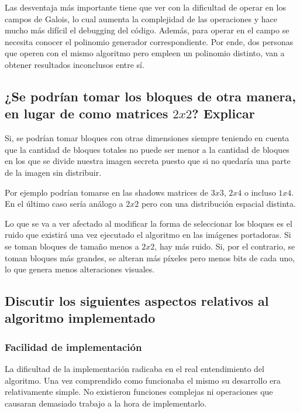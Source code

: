 \documentclass[11pt]{scrartcl} %
\begin{document}
Las desventaja más importante tiene que ver con la dificultad de operar en los campos de Galois, lo cual aumenta la complejidad de las operaciones y hace mucho más difícil el debugging del código. Además, para operar en el campo se necesita conocer el polinomio generador correspondiente. Por ende, dos personas que operen con el mismo algoritmo pero empleen un polinomio distinto, van a obtener resultados inconclusos entre sí.

\subsection{¿Se podrían tomar los bloques de otra manera, en lugar de como matrices $2x2$? Explicar}

Si, se podrían tomar bloques con otras dimensiones siempre teniendo en cuenta que la cantidad de bloques totales no puede ser menor a la cantidad de bloques en los que se divide nuestra imagen secreta puesto que si no quedaría una parte de la imagen sin distribuir. 

Por ejemplo podrían tomarse en las shadows matrices de $3x3$, $2x4$ o incluso $1x4$. En el último caso sería análogo a $2x2$ pero con una distribución espacial distinta.

Lo que se va a ver afectado al modificar la forma de seleccionar los bloques es el ruido que existirá una vez ejecutado el algoritmo en las imágenes portadoras. Si se toman bloques de tamaño menos a $2x2$, hay más ruido. Si, por el contrario, se toman bloques más grandes, se alteran más píxeles pero menos bits de cada uno, lo que genera menos alteraciones visuales.

\subsection{Discutir los siguientes aspectos relativos al algoritmo implementado}
\subsubsection{Facilidad de implementación}

La dificultad de la implementación radicaba en el real entendimiento del algoritmo. Una vez comprendido como funcionaba el mismo su desarrollo era relativamente simple. No existieron funciones complejas ni operaciones que causaran demasiado trabajo a la hora de implementarlo.
\end{document}
